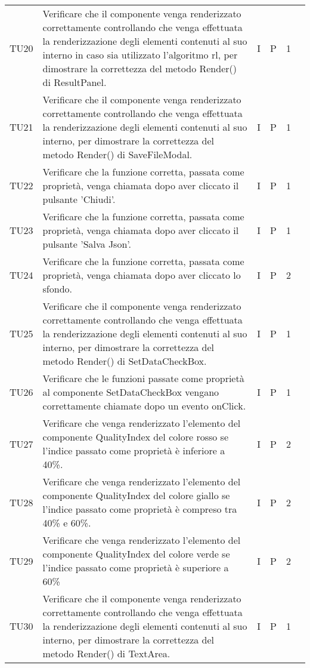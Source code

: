 \begin{longtable} {
		>{}p{12mm}
		>{}p{79.5mm}
		>{}p{9mm}
		>{}p{8mm}
		>{}p{14mm}
		>{}p{0mm}}
	TU20		& Verificare che il componente venga renderizzato correttamente controllando che venga effettuata la renderizzazione degli elementi contenuti al suo interno in caso sia utilizzato l'algoritmo rl, per dimostrare la correttezza del metodo Render() di ResultPanel. & I & P & 1 & \TBstrut \\ [2mm]
	TU21		& Verificare che il componente venga renderizzato correttamente controllando che venga effettuata la renderizzazione degli elementi contenuti al suo interno, per dimostrare la correttezza del metodo Render() di SaveFileModal. & I & P & 1 & \TBstrut \\ [2mm]
	TU22		& Verificare che la funzione corretta, passata come proprietà, venga chiamata dopo aver cliccato il pulsante 'Chiudi'. & I & P & 1 & \TBstrut \\ [2mm]
	TU23		& Verificare che la funzione corretta, passata come proprietà, venga chiamata dopo aver cliccato il pulsante 'Salva Json'. & I & P & 1 & \TBstrut \\ [2mm]
	TU24		& Verificare che la funzione corretta, passata come proprietà, venga chiamata dopo aver cliccato lo sfondo. & I & P & 2 & \TBstrut \\ [2mm]
	TU25		& Verificare che il componente venga renderizzato correttamente controllando che venga effettuata la renderizzazione degli elementi contenuti al suo interno, per dimostrare la correttezza del metodo Render() di SetDataCheckBox. & I & P & 1 & \TBstrut \\ [2mm]
	TU26		& Verificare che le funzioni passate come proprietà al componente SetDataCheckBox vengano correttamente chiamate dopo un evento onClick. & I & P & 1 & \TBstrut \\ [2mm]
	TU27		& Verificare che venga renderizzato l'elemento del componente QualityIndex del colore rosso se l'indice passato come proprietà è inferiore a 40\%. & I & P & 2 & \TBstrut \\ [2mm]
	TU28		& Verificare che venga renderizzato l'elemento del componente QualityIndex del colore giallo se l'indice passato come proprietà è compreso tra 40\% e 60\%. & I & P & 2 & \TBstrut \\ [2mm]
	TU29		& Verificare che venga renderizzato l'elemento del componente QualityIndex del colore verde se l'indice passato come proprietà è superiore a 60\% & I & P & 2 & \TBstrut \\ [2mm]
	TU30		& Verificare che il componente venga renderizzato correttamente controllando che venga effettuata la renderizzazione degli elementi contenuti al suo interno, per dimostrare la correttezza del metodo Render() di TextArea. & I & P & 1 & \TBstrut \\ [2mm]

\end{longtable}
